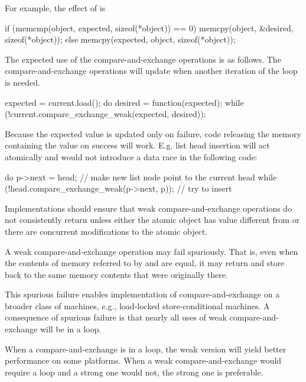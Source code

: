 \begin{itemdescr}
\pnum
\begin{note} For example, the effect of
 is
\begin{codeblock}
if (memcmp(object, expected, sizeof(*object)) == 0)
  memcpy(object, &desired, sizeof(*object));
else
  memcpy(expected, object, sizeof(*object));
\end{codeblock}
\end{note}
\begin{example} The expected use of the compare-and-exchange operations is as follows. The
compare-and-exchange operations will update  when another iteration of
the loop is needed.
\begin{codeblock}
expected = current.load();
do {
  desired = function(expected);
} while (!current.compare_exchange_weak(expected, desired));
\end{codeblock}
\end{example}
\begin{example} Because the expected value is updated only on failure,
code releasing the memory containing the  value on success will work.
E.g. list head insertion will act atomically and would not introduce a
data race in the following code:
\begin{codeblock}
do {
  p->next = head; // make new list node point to the current head
} while (!head.compare_exchange_weak(p->next, p)); // try to insert
\end{codeblock}
\end{example}

\pnum
Implementations should ensure that weak compare-and-exchange operations do not
consistently return  unless either the atomic object has value
different from  or there are concurrent modifications to the
atomic object.

\pnum
\remarks
A weak compare-and-exchange operation may fail spuriously. That is, even when
the contents of memory referred to by  and  are
equal, it may return  and store back to  the same memory
contents that were originally there.
\begin{note} This
spurious failure enables implementation of compare-and-exchange on a broader class of
machines, e.g., load-locked store-conditional machines. A
consequence of spurious failure is that nearly all uses of weak compare-and-exchange
will be in a loop.

When a compare-and-exchange is in a loop, the weak version will yield better performance
on some platforms. When a weak compare-and-exchange would require a loop and a strong one
would not, the strong one is preferable.
\end{note}


\end{itemdescr}
